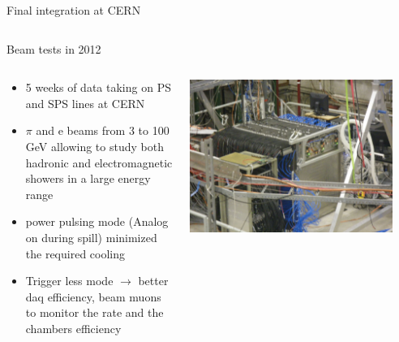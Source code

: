 \documentclass[10pt]{beamer}
\begin{document}
\begin{frame}{Final integration at CERN}
\begin{columns}
\begin{column}{0.5\textwidth}
      \end{column}
    \end{columns}
\end{frame}

\begin{frame}{Beam tests in 2012}
  \begin{columns}
    \begin{column}{0.4\textwidth}
      \begin{block}{}
        \begin{itemize}
        \item 5 weeks of data taking on PS and SPS lines at CERN
        \item $\pi$ and e beams from 3 to 100 GeV allowing to study both hadronic and electromagnetic showers in a large energy range
         \item power pulsing mode (Analog on during spill) minimized the required cooling
         \item Trigger less mode $\rightarrow$ better daq efficiency, beam muons to monitor the rate and the chambers efficiency
        \end{itemize}
      \end{block}
    \end{column}
    \begin{column}{0.6\textwidth}
      \centerline{\includegraphics[width=0.9\textwidth,height=0.5\textheight]{jpg/1m3Photo.jpg}}
    \end{column}
  \end{columns}
\end{frame}
\end{document}
